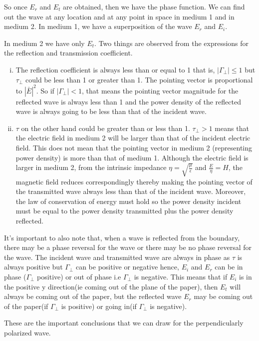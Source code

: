 So once $E_{r}$ and $E_{t}$ are obtained, then we have the phase function. We can find out the wave at any location and at any point in space in medium 1 and in medium 2. In medium  1, we have a superposition of the wave $E_{r}$ and $E_{i}$.

In medium 2 we have only $E_{t}$. Two things are observed from the expressions for the reflection and transmission coefficient.
\begin{enumerate}[(i)]
\item The reflection coefficient is always less than or equal to 1 that is, $|\Gamma_{\bot}| \leq 1$ but $\tau_{\bot}$ could be less than 1 or greater than 1. The pointing vector is proportional  to $|\bar{E}|^{2}$. So if $|\Gamma_{\bot}|< 1$, that means the pointing vector magnitude for the reflected wave is always less than 1 and the power density of the reflected wave is always going to be less than that of the incident wave.
\item $\tau$ on the other hand could be greater than or less than 1.  $\tau_{\bot} > 1$ means that the electric field in medium 2 will be larger than that of the incident electric field. This does not mean that the pointing vector in medium 2 (representing power density) is more than that of medium 1. Although the electric field is larger in medium 2, from the intrinsic impedance $\eta=\sqrt{\frac{\mu}{\epsilon}}$ and $\frac{E}{\eta} =H$, the magnetic field reduces correspondingly thereby making the pointing vector of the transmitted wave always less than that of the incident wave. Moreover, the law of conservation of energy must hold so the power density incident must be equal to the power density transmitted plus the power density reflected.
\end{enumerate}
It's important to also note that, when a wave is reflected from the boundary, there may be a phase reversal for the wave or there may be no phase reversal for the wave. The incident wave and transmitted wave are always in phase as $\tau$ is always positive but $\Gamma_{\perp}$ can be positive or negative hence, $E_{i}$ and $E_{r}$ can be in phase ($\Gamma_{\perp}$ positive) or out of phase i.e $\Gamma_{\perp}$ is negative. This means that if $E_{i}$ is in the positive y direction(ie coming out of the plane of the paper), then $E_{t}$ will always be coming out of the paper, but the reflected wave $E_{r}$ may be coming out of the paper(if $\Gamma_{\perp}$ is positive) or going in(if $\Gamma_{\perp}$ is negative).

These are the important conclusions that we can draw for the perpendicularly polarized wave.

